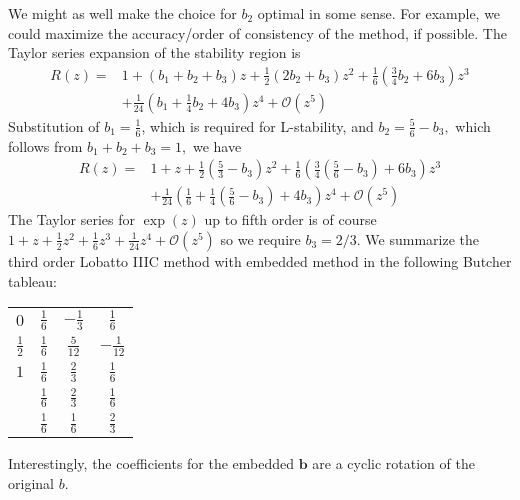 \documentclass[10pt,a4paper]{article}
\newcommand{\half}[0]{\frac{1}{2}}
\newcommand{\bvec}[1]{\mathbf{#1}}
\begin{document}
We might as well make the choice for $b_2$ optimal in some sense. For example, we could maximize the accuracy/order of consistency of the method, if possible.
The Taylor series expansion of the stability region is
\begin{align*}
  R(z) =& 1 + (b_1+b_2+b_3)z + \half \left(2b_2 + b_3\right)z^2 + \frac{1}{6}\left(\frac{3}{4}b_2 + 6b_3\right)z^3 \\
  &+ \frac{1}{24}\left(b_1 + \frac{1}{4}b_2 + 4b_3\right)z^4 + \mathcal{O}(z^5)
\end{align*}
Substitution of $b_1=\frac{1}{6}$, which is required for L-stability, and $b_2 = \frac{5}{6}-b_3,$ which follows from $b_1+b_2+b_3=1,$ we have
\begin{align*}
  R(z) =& 1 + z + \half \left(\frac{5}{3} - b_3\right)z^2 + \frac{1}{6}\left(\frac{3}{4}\left(\frac{5}{6} - b_3\right) + 6b_3\right)z^3 \\
  &+ \frac{1}{24}\left(\frac{1}{6} + \frac{1}{4}\left(\frac{5}{6} - b_3\right) + 4b_3\right)z^4 + \mathcal{O}(z^5)
\end{align*}
The Taylor series for $\exp(z)$ up to fifth order is of course $1 + z + \half z^2 + \frac{1}{6}z^3 + \frac{1}{24}z^4 + \mathcal{O}(z^5)$ so we require $b_3 = 2/3.$
We summarize the third order Lobatto IIIC method with embedded method in the following Butcher tableau:
\begin{table}[h]
  \centering
  \begin{tabular}{c|ccc}
    $0$ & $\frac{1}{6}$ & $-\frac{1}{3}$ & $\frac{1}{6}$ \\
    $\half$ & $\frac{1}{6}$ & $\frac{5}{12}$ & $-\frac{1}{12}$ \\
    $1$ & $\frac{1}{6}$ & $\frac{2}{3}$  & $\frac{1}{6}$ \\ \hline
    {} & $\frac{1}{6}$ & $\frac{2}{3}$  & $\frac{1}{6}$ \\
    {} & $\frac{1}{6}$ & $\frac{1}{6}  $& $\frac{2}{3}$
  \end{tabular}
\end{table}
Interestingly, the coefficients for the embedded $\bvec{b}$ are a cyclic rotation of the original $b.$
\end{document}
